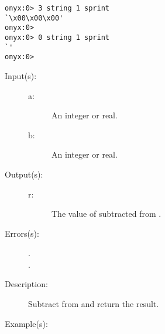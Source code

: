 \begin{description}
\begin{description}
\begin{verbatim}
onyx:0> 3 string 1 sprint
`\x00\x00\x00'
onyx:0>
onyx:0> 0 string 1 sprint
`'
onyx:0>
		\end{verbatim}
	\end{description}
\label{systemdict:sub}
\item[{\onyxop{a b}{sub}{r}}: ]
	\begin{description}\item[]
	\item[Input(s): ]
		\begin{description}\item[]
		\item[a: ]
			An integer or real.
		\item[b: ]
			An integer or real.
		\end{description}
	\item[Output(s): ]
		\begin{description}\item[]
		\item[r: ]
			The value of  subtracted from .
		\end{description}
	\item[Errors(s): ]
		\begin{description}\item[]
		\item[.]
		\item[.]
		\end{description}
	\item[Description: ]
		Subtract  from  and return the result.
	\item[Example(s): ]\begin{verbatim}


\end{verbatim}
\end{description}
\end{description}

